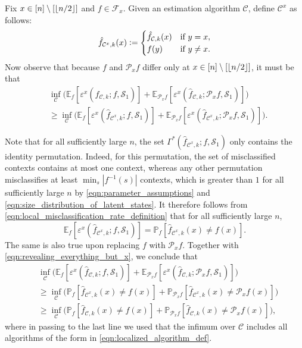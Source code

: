 \documentclass[11pt]{article}
\newcommand{\eqdef}{\vcentcolon=}
\newcommand{\mcC}{\mathcal{C}}
\newcommand{\mcF}{\mathcal{F}}
\newcommand{\mcP}{\mathcal{P}}
\newcommand{\mcS}{\mathcal{S}}
\newcommand{\mbbP}{\mathbb{P}}
\newcommand{\mbbE}{\mathbb{E}}
\DeclarePairedDelimiter\floor{\lfloor}{\rfloor}
\theoremstyle{definition}
\theoremstyle{definition}
\begin{document}
Fix $x\in[n]\setminus[\floor{n/2}]$ and $f\in\mcF_x$.
Given an estimation algorithm $\mcC$, define $\mcC^x$ as follows:
\begin{equation}
	\label{eqn:localized_algorithm_def}
	\hat{f}_{\mcC^x,k}(x)
	\eqdef
	\begin{cases}
		\hat{f}_{\mcC,k}(x) & \textnormal{if }y=x,     \\
		f(y)                & \textnormal{if }y\neq x. \\
	\end{cases}
\end{equation}
Now observe that because $f$ and $\mcP_xf$ differ only at $x\in [n]\setminus[\floor{n/2}]$, it must be that
\begin{align}
	\nonumber
	 &
	\inf_{\mcC}
	\bigl(
	\mbbE_{f}[
			\varepsilon^x(\hat{f}_{\mcC,k};f,\mcS_1)
		]
	+
	\mbbE_{\mcP_xf}[
			\varepsilon^x(\hat{f}_{\mcC,k};\mcP_x f,\mcS_1)
		]
	\bigr)
	\\
	 &
	\geq
	\inf_{\mcC}
	\bigl(
	\mbbE_{f}[
			\varepsilon^x(\hat{f}_{\mcC^x,k};f,\mcS_1)
		]
	+
	\mbbE_{\mcP_xf}[
			\varepsilon^x(\hat{f}_{\mcC^x,k};\mcP_x f,\mcS_1)
		]
	\bigr)
	.
	\label{eqn:revealing_everything_but_x}
\end{align}

Note that for all sufficiently large $n$, the set $\Gamma^*(\hat{f}_{\mcC^x,k};f,\mcS_1)$ only contains the identity permutation.
Indeed, for this permutation, the set of misclassified contexts contains at most one context, whereas any other permutation misclassifies at least $\min_{s}|f^{-1}(s)|$ contexts, which is greater than $1$ for all sufficiently large $n$ by \eqref{eqn:parameter_assumptions} and \eqref{eqn:size_distribution_of_latent_states}.
It therefore follows from \eqref{eqn:local_misclassification_rate_definition} that for all sufficiently large $n$,
\begin{equation}
	\mbbE_{f}[
		\varepsilon^x(\hat{f}_{\mcC^x,k};f,\mcS_1)
	]
	=
	\mbbP_{f}[
		\hat{f}_{\mcC^x,k}(x)\neq f(x)
	]
	.
\end{equation}
The same is also true upon replacing $f$ with $\mcP_xf$.
Together with \eqref{eqn:revealing_everything_but_x}, we conclude that
\begin{align}
	\nonumber
	 &
	\inf_{\mcC}
	\bigl(
	\mbbE_{f}[
			\varepsilon^x(\hat{f}_{\mcC,k};f,\mcS_1)
		]
	+
	\mbbE_{\mcP_xf}[
			\varepsilon^x(\hat{f}_{\mcC,k};\mcP_x f,\mcS_1)
		]
	\bigr)
	\\
	 &
	\geq
	\inf_{\mcC}
	\bigl(
	\mbbP_{f}[
			\hat{f}_{\mcC^x,k}(x)\neq f(x)
		]
	+
	\mbbP_{\mcP_xf}[
			\hat{f}_{\mcC^x,k}(x)\neq \mcP_xf(x)
		]
	\bigr)
	\nonumber
	\\
	 &
	\geq
	\inf_{\mcC}
	\bigl(
	\mbbP_{f}[
			\hat{f}_{\mcC,k}(x)\neq f(x)
		]
	+
	\mbbP_{\mcP_xf}[
			\hat{f}_{\mcC,k}(x)\neq \mcP_xf(x)
		]
	\bigr)
	,
	\label{eqn:from_local_error_to_probabilities}
\end{align}
where in passing to the last line we used that the infimum over $\mcC$ includes all algorithms of the form in \eqref{eqn:localized_algorithm_def}.
\end{document}
